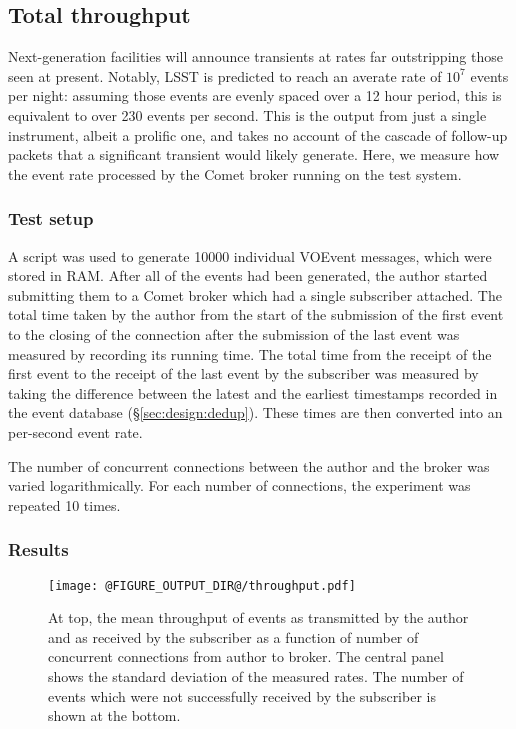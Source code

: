 \documentclass[5p,authoryear]{elsarticle}
\begin{document}
\subsection{Total throughput}
\label{sec:perf:total}

Next-generation facilities will announce transients at rates far outstripping
those seen at present. Notably, LSST is predicted to reach an averate rate of
$10^7$ events per night: assuming those events are evenly spaced over a 12
hour period, this is equivalent to over 230 events per second. This is the
output from just a single instrument, albeit a prolific one, and takes no
account of the cascade of follow-up packets that a significant transient would
likely generate. Here, we measure how the event rate processed by the Comet
broker running on the test system.

\subsubsection{Test setup}
\label{sec:perf:total:setup}

A script was used to generate 10000 individual VOEvent messages, which were
stored in RAM. After all of the events had been generated, the author started
submitting them to a Comet broker which had a single subscriber attached. The
total time taken by the author from the start of the submission of the first
event to the closing of the connection after the submission of the last event
was measured by recording its running time. The total time from the receipt of
the first event to the receipt of the last event by the subscriber was
measured by taking the difference between the latest and the earliest
timestamps recorded in the event database (\S\ref{sec:design:dedup}). These
times are then converted into an per-second event rate.

The number of concurrent connections between the author and the broker was
varied logarithmically. For each number of connections, the experiment was
repeated 10 times.

\subsubsection{Results}
\label{sec:perf:total:results}

\begin{figure}
  \begin{center}
  \texttt{[image: @FIGURE\_OUTPUT\_DIR@/throughput.pdf]}
  \end{center}

  \caption{At top, the mean throughput of events as transmitted by
  the author and as received by the subscriber as a function of number of
  concurrent connections from author to broker. The central panel shows the
  standard deviation of the measured rates. The number of events which were
  not successfully received by the subscriber is shown at the bottom.}

  \label{fig:throughput}
\end{figure}
\end{document}
